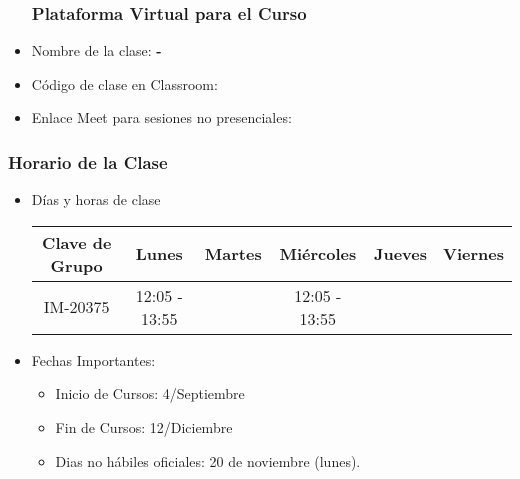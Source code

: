 
\begin{frame}
\begin{itemize}
\frametitle{Plataforma Virtual para el Curso}
\item Nombre de la clase: \textbf{\nombreMateria-\cuatrimestre}
\item Código de clase en Classroom: \textbf{\claveClassroom}
\item Enlace Meet para sesiones no presenciales: \textbf{\claveMeet}
\end{itemize}
\end{frame}

\begin{frame}
\frametitle{Horario de la Clase}


\begin{itemize}
\item Días y horas de clase
\tiny
\begin{spacing}{1.0}
\begin{center}
\begin{tabular}{c|ccccc}
\hline 
\textbf{Clave de Grupo}          & Lunes           & Martes       & Miércoles      & Jueves          & Viernes        \\  \hline 
IM-20375  & 12:05 - 13:55   &              & 12:05 - 13:55  &                 &                \\
\hline
\end{tabular}
\end{center}
\end{spacing}
\normalsize
\item Fechas Importantes:
\begin{itemize}
\item Inicio de Cursos: 4/Septiembre
\item Fin de Cursos: 12/Diciembre
\item Dias no hábiles oficiales: 20 de noviembre (lunes). 
\end{itemize}
\end{itemize}

\end{frame}


